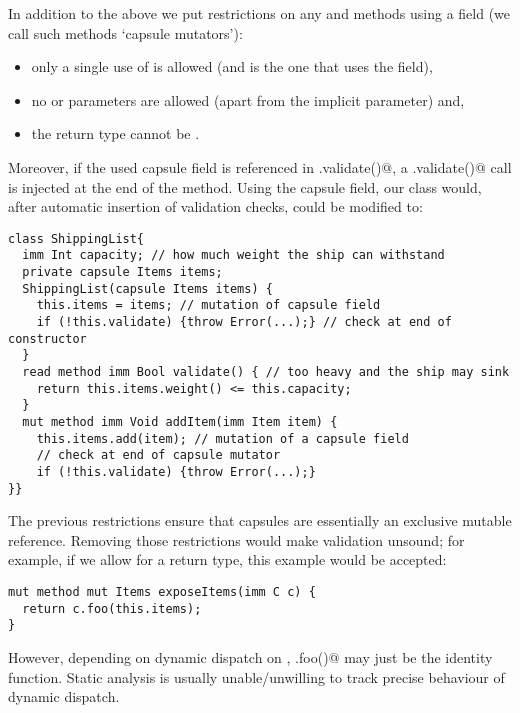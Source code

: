 In addition to the above we put restrictions on any \Q@mut@ and \Q@capsule@ methods using a \Q@capsule@ field (we call such methods `capsule mutators'):
\begin{itemize}
\item only a single use of \Q@this@ is allowed (and is the one that uses the field),
\item no \Q@mut@ or \Q@read@ parameters are allowed (apart from the implicit \Q@this@ parameter) and,
\item the return type cannot be \Q@mut@.
\end{itemize}
\noindent  Moreover, if the used capsule field is referenced in \Q@.validate()@, a \Q@this.validate()@ call is injected at the end of the method.
Using the capsule field, our \Q@ShippingList@ class would, after automatic insertion of validation checks, could be modified to:
\saveSpace
\begin{lstlisting}
class ShippingList{
  imm Int capacity; // how much weight the ship can withstand
  private capsule Items items;
  ShippingList(capsule Items items) {
    this.items = items; // mutation of capsule field
    if (!this.validate) {throw Error(...);} // check at end of constructor
  }
  read method imm Bool validate() {	// too heavy and the ship may sink
    return this.items.weight() <= this.capacity;
  }
  mut method imm Void addItem(imm Item item) {
    this.items.add(item); // mutation of a capsule field
    // check at end of capsule mutator
    if (!this.validate) {throw Error(...);}
}}
\end{lstlisting}
\saveSpace

\noindent The previous restrictions ensure that capsules are essentially an exclusive mutable reference.
Removing those restrictions would make validation unsound; for example, if we allow for a \Q@mut@ return type, this example would be accepted:

\saveSpace
\begin{lstlisting}
mut method mut Items exposeItems(imm C c) {
  return c.foo(this.items);
}
\end{lstlisting}
\saveSpace
\noindent However, depending on dynamic dispatch on \Q@c@, \Q@c.foo()@ may just be the identity function.
Static analysis is usually unable/unwilling to track precise behaviour of dynamic dispatch.

